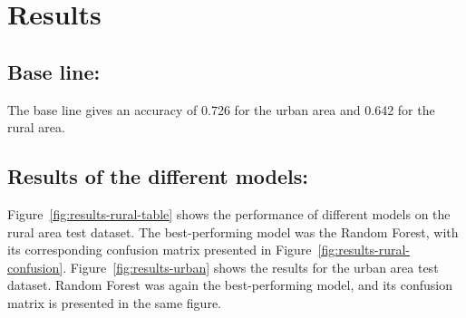 \documentclass[11pt]{article}
\begin{document}
\section{Results}
\subsection[\appendixname~\thesubsection]{Base line:}
\par
The base line gives an accuracy of 0.726 for the urban area and 0.642 for the rural area.
\par


\subsection[\appendixname~\thesubsection]{Results of the different models:}
\par
Figure~\ref{fig:results-rural-table} shows the performance of different models on the rural area test dataset.  
The best-performing model was the Random Forest, with its corresponding confusion matrix presented in Figure~\ref{fig:results-rural-confusion}. Figure~\ref{fig:results-urban} shows the results for the urban area test dataset. Random Forest was again the best-performing model, and its confusion matrix is presented in the same figure.
\end{document}
